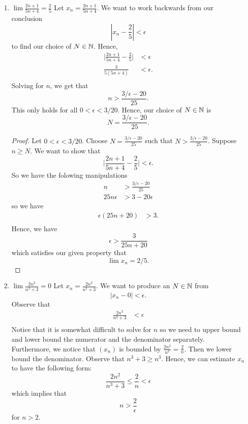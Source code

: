 \begin{enumerate}
    \item \( \lim \frac{2n+1}{5n+4} = \frac{2}{5}\)
            Let \( x_n = \frac{2n+1}{5n+4} \). We want to work backwards from our conclusion 
            \[ |x_n - \frac{2}{5}| < \epsilon \] to find our choice of \( N \in \mathbb{N} \). Hence,
            \begin{align*}
                \Big| \frac{2n+1}{5n+4} - \frac{2}{5} \Big| &< \epsilon  \\
                \frac{3}{5(5n+4)} &< \epsilon.  \\
            \end{align*}
    Solving for \( n \), we get that 
    \[ n > \frac{ 3/ \epsilon - 20}{25}.\]
    This only holds for all \( 0 < \epsilon < 3/20\). Hence, our choice of \( N \in \mathbb{N} \) is 
    \[ N = \frac{ 3/ \epsilon - 20}{25}.\]
        \begin{proof}
        Let \( 0 < \epsilon < 3/20 \). Choose \( N = \frac{ 3/ \epsilon - 20}{25}\) such that 
        \( N > \frac{ 3/ \epsilon - 20}{25}\). Suppose \( n \geq N \). We want to show that 
        \[ \Big| \frac{2n+1}{5n+4} - \frac{2}{5} \Big| < \epsilon.\]
        So we have the folowing manipulations
        \begin{align*} 
        n &> \frac{ 3/ \epsilon - 20}{25} \\
        25n \epsilon &> 3 - 20 \epsilon
        \end{align*}
        so we have 
        \begin{align*}
          \epsilon (25n + 20)&> 3.\\
        \end{align*}
        Hence, we have 
        \[  \epsilon > \frac{3}{25n + 20}\] which satisfies our given property that 
        \[ \lim x_n = 2/5.\]

        \end{proof}
    \item \( \lim \frac{2n^2}{n^3 + 3} = 0 \)
        Let \( x_n = \frac{2n^2}{n^3 + 3}\). We want to produce an \( N \in \mathbb{N} \) from 
        \[ |x_n - 0| < \epsilon. \]
        Observe that 
        \begin{align*}
        \frac{2n^2}{n^3 + 3}&< \epsilon  \\
        \end{align*}
       Notice that it is somewhat difficult to solve for \( n \) so we need to upper bound and lower bound the numerator and the denominator separately. Furthermore, we notice that \( (x_n)\) is bounded by \( \frac{2n^2}{n^3} = \frac{2}{n} \).  Then we lower bound the denominator. Observe that \( n^3 + 3 \geq n^3  \). Hence, we can estimate \( x_n \) to have the following form:
       \[ \frac{2n^2}{n^3 + 3 } \leq \frac{2}{n} < \epsilon \]
       which implies that 
       \[ n > \frac{2}{ \epsilon }\]
       for \( n > 2 \). 


\end{enumerate}
